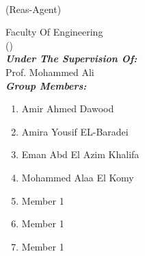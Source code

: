 \begin{titlepage}
\begin{center}

\vspace{30pt} {%
  \renewcommand*{\familydefault}{\defaultFont}
  \fontsize{40pt}{48pt}\selectfont%
  \reportTitle{}\\
  \vspace{10pt}%
  \fontsize{26pt}{31pt}\selectfont%
  (Reas-Agent)
}

\fontsize{16pt}{19pt}\selectfont%

\vspace{30pt}

Faculty Of Engineering \\
(\studyDepartment)\\

\vspace{30pt}
\textbf{\textit{Under The Supervision Of:}}\\

\vspace{5pt}
Prof. Mohammed Ali\\


\vspace{30pt}
\textbf{\textit{Group Members:}}\\


\vspace{5pt} 

\begin{enumerate}  [leftmargin=5.8cm]
    \item Amir Ahmed Dawood
    \item Amira Yousif EL-Baradei
    \item Eman Abd El Azim Khalifa
    \item Mohammed Alaa El Komy
    \item Member 1
    \item Member 1
    \item Member 1
\end{enumerate}



\vfill

\end{center}
\end{titlepage}